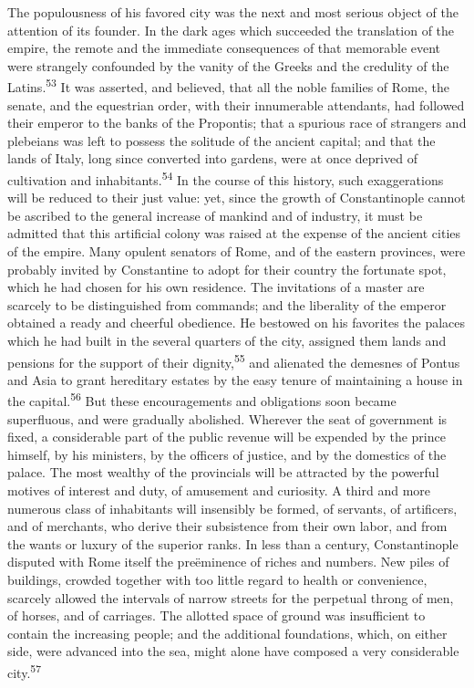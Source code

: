
The populousness of his favored city was the next and most
serious object of the attention of its founder. In the dark ages
which succeeded the translation of the empire, the remote and the
immediate consequences of that memorable event were strangely
confounded by the vanity of the Greeks and the credulity of the
Latins.\textsuperscript{53} It was asserted, and believed, that all the noble
families of Rome, the senate, and the equestrian order, with
their innumerable attendants, had followed their emperor to the
banks of the Propontis; that a spurious race of strangers and
plebeians was left to possess the solitude of the ancient
capital; and that the lands of Italy, long since converted into
gardens, were at once deprived of cultivation and inhabitants.\textsuperscript{54}
In the course of this history, such exaggerations will be reduced
to their just value: yet, since the growth of Constantinople
cannot be ascribed to the general increase of mankind and of
industry, it must be admitted that this artificial colony was
raised at the expense of the ancient cities of the empire. Many
opulent senators of Rome, and of the eastern provinces, were
probably invited by Constantine to adopt for their country the
fortunate spot, which he had chosen for his own residence. The
invitations of a master are scarcely to be distinguished from
commands; and the liberality of the emperor obtained a ready and
cheerful obedience. He bestowed on his favorites the palaces
which he had built in the several quarters of the city, assigned
them lands and pensions for the support of their dignity,\textsuperscript{55} and
alienated the demesnes of Pontus and Asia to grant hereditary
estates by the easy tenure of maintaining a house in the capital.\textsuperscript{56}
But these encouragements and obligations soon became
superfluous, and were gradually abolished. Wherever the seat of
government is fixed, a considerable part of the public revenue
will be expended by the prince himself, by his ministers, by the
officers of justice, and by the domestics of the palace. The most
wealthy of the provincials will be attracted by the powerful
motives of interest and duty, of amusement and curiosity. A third
and more numerous class of inhabitants will insensibly be formed,
of servants, of artificers, and of merchants, who derive their
subsistence from their own labor, and from the wants or luxury of
the superior ranks. In less than a century, Constantinople
disputed with Rome itself the preëminence of riches and numbers.
New piles of buildings, crowded together with too little regard
to health or convenience, scarcely allowed the intervals of
narrow streets for the perpetual throng of men, of horses, and of
carriages. The allotted space of ground was insufficient to
contain the increasing people; and the additional foundations,
which, on either side, were advanced into the sea, might alone
have composed a very considerable city.\textsuperscript{57}

